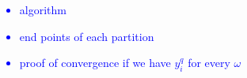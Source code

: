 \documentclass[11pt]{article}
\begin{document}
	\textcolor{blue}{
	\begin{itemize}
		\item algorithm
		\item end points of each partition
		\item proof of convergence if we have \(y_i^q\) for every \(\omega\)
	\end{itemize}}

\end{document}
